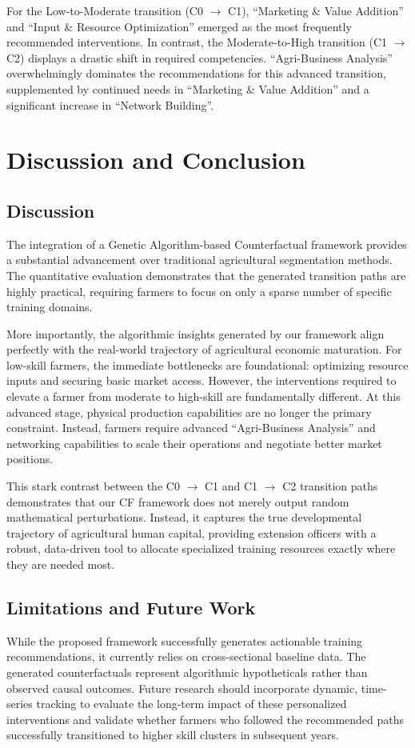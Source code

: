 \documentclass[12pt, a4paper]{article}
\begin{document}
For the Low-to-Moderate transition (C0 $\rightarrow$ C1), ``Marketing \& Value Addition'' and ``Input \& Resource Optimization'' emerged as the most frequently recommended interventions. In contrast, the Moderate-to-High transition (C1 $\rightarrow$ C2) displays a drastic shift in required competencies. ``Agri-Business Analysis'' overwhelmingly dominates the recommendations for this advanced transition, supplemented by continued needs in ``Marketing \& Value Addition'' and a significant increase in ``Network Building''.

\section{Discussion and Conclusion}\label{sec5}

\subsection{Discussion}
The integration of a Genetic Algorithm-based Counterfactual framework provides a substantial advancement over traditional agricultural segmentation methods. The quantitative evaluation demonstrates that the generated transition paths are highly practical, requiring farmers to focus on only a sparse number of specific training domains.

More importantly, the algorithmic insights generated by our framework align perfectly with the real-world trajectory of agricultural economic maturation. For low-skill farmers, the immediate bottlenecks are foundational: optimizing resource inputs and securing basic market access. However, the interventions required to elevate a farmer from moderate to high-skill are fundamentally different. At this advanced stage, physical production capabilities are no longer the primary constraint. Instead, farmers require advanced ``Agri-Business Analysis'' and networking capabilities to scale their operations and negotiate better market positions. 

This stark contrast between the C0 $\rightarrow$ C1 and C1 $\rightarrow$ C2 transition paths demonstrates that our CF framework does not merely output random mathematical perturbations. Instead, it captures the true developmental trajectory of agricultural human capital, providing extension officers with a robust, data-driven tool to allocate specialized training resources exactly where they are needed most.

\subsection{Limitations and Future Work}
While the proposed framework successfully generates actionable training recommendations, it currently relies on cross-sectional baseline data. The generated counterfactuals represent algorithmic hypotheticals rather than observed causal outcomes. Future research should incorporate dynamic, time-series tracking to evaluate the long-term impact of these personalized interventions and validate whether farmers who followed the recommended paths successfully transitioned to higher skill clusters in subsequent years.
\end{document}

